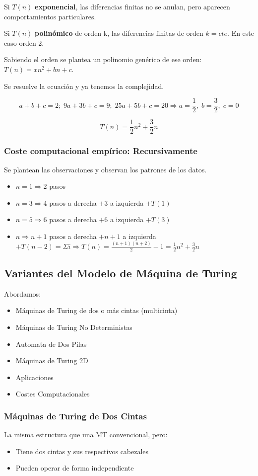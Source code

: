 Si $T(n)$ \textbf{exponencial}, las diferencias finitas no se anulan, pero aparecen comportamientos particulares.

Si $T(n)$ \textbf{polinómico} de orden k, las diferencias finitas de orden $k=cte$. En este caso orden 2.

Sabiendo el orden se plantea un polinomio genérico de ese orden: $T(n)=xn^2+bn+c$.

Se resuelve la ecuación y ya tenemos la complejidad.

$$a+b+c=2;\; 9a+3b+c=9;\; 25a+5b+c=20 \Rightarrow a=\frac{1}{2},\; b=\frac{3}{2},\; c=0$$

$$T(n)=\frac{1}{2}n^2+\frac{3}{2}n$$

\subsubsection{Coste computacional empírico: Recursivamente}
Se plantean las observaciones y observan los patrones de los datos.

\begin{itemize}
    \item $n=1 \Rightarrow 2$ pasos
    \item $n=3 \Rightarrow 4$ pasos a derecha $+ 3$ a izquierda $+ T(1)$
    \item $n=5 \Rightarrow 6$ pasos a derecha $+ 6$ a izquierda $+ T(3)$
    \item $n \Rightarrow n+1$ pasos a derecha $+ n+1$ a izquierda $+ T(n-2) = \Sigma i \Rightarrow T(n)=\frac{(n+1)(n+2)}{2}-1=\frac{1}{2}n^2+\frac{3}{2}n$ 
\end{itemize}

\subsection{Variantes del Modelo de Máquina de Turing}
Abordamos:
\begin{itemize}
    \item Máquinas de Turing de dos o más cintas (multicinta)
    \item Máquinas de Turing No Deterministas
    \item Automata de Dos Pilas
    \item Máquinas de Turing 2D
    \item Aplicaciones
    \item Costes Computacionales
\end{itemize}

\subsubsection{Máquinas de Turing de Dos Cintas}
La misma estructura que una MT convencional, pero:
\begin{itemize}
    \item Tiene dos cintas y sus respectivos cabezales
    \item Pueden operar de forma independiente
\end{itemize}

